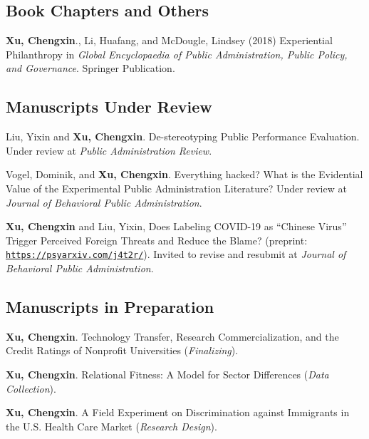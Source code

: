 \documentclass[letterpaper]{article}
\renewenvironment{itemize}{
  \begin{list}{}{
    \setlength{\leftmargin}{1.5em}
  }
}{
  \end{list}
}
\begin{document}
\subsection*{Book Chapters and Others}
\begin{itemize}
	
\item \textbf{Xu, Chengxin}., Li, Huafang, and McDougle, Lindsey (2018) Experiential Philanthropy in {\it Global Encyclopaedia of Public Administration, Public Policy, and Governance}. Springer Publication.

\end{itemize}

\subsection*{Manuscripts Under Review}
\begin{itemize}
	
\item Liu, Yixin and \textbf{Xu, Chengxin}. De-stereotyping Public Performance Evaluation. Under review at {\it Public Administration Review}.

\item Vogel, Dominik, and \textbf{Xu, Chengxin}. Everything hacked? What is the Evidential Value of the Experimental Public Administration Literature? Under review at {\it Journal of Behavioral Public Administration}.

\item \textbf{Xu, Chengxin} and Liu, Yixin, Does Labeling COVID-19 as “Chinese Virus” Trigger Perceived Foreign Threats and
Reduce the Blame? (preprint: \href{https://psyarxiv.com/j4t2r/}{\tt https://psyarxiv.com/j4t2r/}). Invited to revise and resubmit at {\it Journal of Behavioral Public Administration}.

\end{itemize}


\subsection*{Manuscripts in Preparation}
\begin{itemize}

\item \textbf{Xu, Chengxin}. Technology Transfer, Research Commercialization, and the Credit Ratings of Nonprofit Universities ({\it Finalizing}).

\item \textbf{Xu, Chengxin}. Relational Fitness: A Model for Sector Differences ({\it Data Collection}).

\item \textbf{Xu, Chengxin}. A Field Experiment on Discrimination against Immigrants in the U.S. Health Care Market ({\it Research Design}).

\end{itemize}
\end{document}
